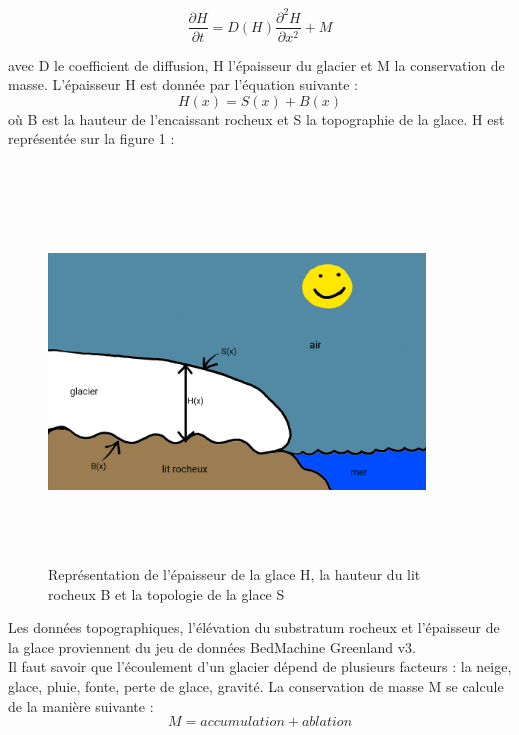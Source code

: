 \documentclass{article}
\begin{document}
\begin{equation}
\frac{\partial H}{\partial t}=D(H)\frac{{\partial}^{2}H}{\partial x^{2}} + M
\label{eq4}
\end{equation}

avec D le coefficient de diffusion, H l'épaisseur du glacier et M la conservation de masse.
\newpage
L'épaisseur H est donnée par l'équation suivante :
\begin{equation}
H(x) = S(x) + B(x)
\label{eq4}
\end{equation}
où B est la hauteur de l'encaissant rocheux et S la topographie de la glace. H est représentée sur la figure 1 : 
\\
\\
\begin{figure}[!htpb]
\centering
\includegraphics[width=10cm, keepaspectratio=true, height=10cm]{H.png}
\caption{Représentation de l'épaisseur de la glace H, la hauteur du lit rocheux B et la topologie de la glace S}
\label{fig01ch1}
\end{figure}
\newline
Les données topographiques, l'élévation du substratum rocheux et l'épaisseur de la glace proviennent du jeu de données BedMachine Greenland v3. 
\\

Il faut savoir que l'écoulement d'un glacier dépend de plusieurs facteurs : la neige, glace, pluie, fonte, perte de glace, gravité. La conservation de masse M se calcule de la manière suivante :
\begin{equation}
M = accumulation + ablation
\label{5}
\end{equation}
\end{document}
